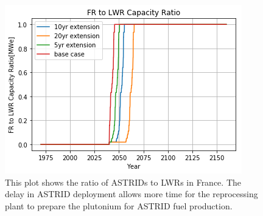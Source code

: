 \begin{figure}[htbp!]
    \begin{center}
        \includegraphics[height=0.25\textheight]{./images/sensitivity/pow_ratio.png}
    \end{center}
    \caption{This plot shows the ratio of \glspl{ASTRID} to \glspl{LWR} in France.
             The delay in \gls{ASTRID} deployment allows more
              time for the reprocessing plant to prepare the plutonium 
              for \gls{ASTRID} fuel production.}
    \label{fig:pow_diff}
\end{figure}
